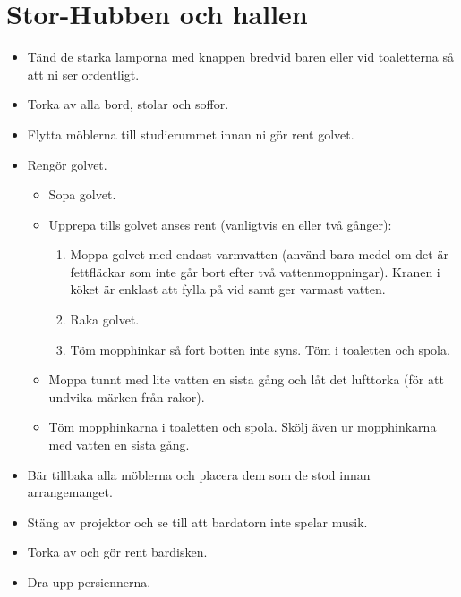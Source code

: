 \section{Stor-Hubben och hallen}
\begin{itemize}
    \item Tänd de starka lamporna med knappen bredvid baren eller vid toaletterna så att ni ser ordentligt.
    \item Torka av alla bord, stolar och soffor.
    \item Flytta möblerna till studierummet innan ni gör rent golvet.
    \item Rengör golvet.
    \begin{itemize}
        \item Sopa golvet.
        \item Upprepa tills golvet anses rent (vanligtvis en eller två gånger):
        \begin{enumerate}
            \item Moppa golvet med endast varmvatten (använd bara medel om det är fettfläckar som inte går bort efter två vattenmoppningar). Kranen i köket är enklast att fylla på vid samt ger varmast vatten.
            \item Raka golvet.
            \item Töm mopphinkar så fort botten inte syns. Töm i toaletten och spola.
        \end{enumerate}
        \item Moppa tunnt med lite vatten en sista gång och låt det lufttorka (för att undvika märken från rakor).
        \item Töm mopphinkarna i toaletten och spola. Skölj även ur mopphinkarna med vatten en sista gång.
    \end{itemize}
    \item Bär tillbaka alla möblerna och placera dem som de stod innan arrangemanget.
    \item Stäng av projektor och se till att bardatorn inte spelar musik.
    \item Torka av och gör rent bardisken.
    \item Dra upp persiennerna.
\end{itemize}

